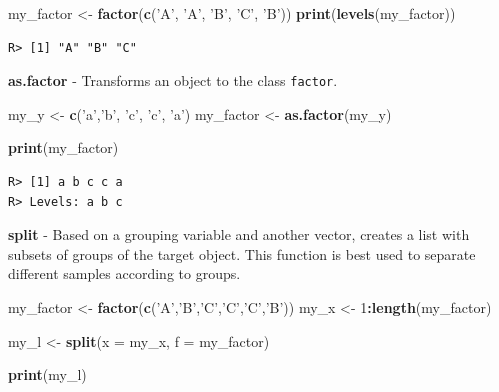 \documentclass[
  12pt,
]{book}
\newenvironment{Shaded}{\begin{snugshade}}{\end{snugshade}}
\newcommand{\DataTypeTok}[1]{\textcolor[rgb]{0.27,0.27,0.27}{#1}}
\newcommand{\DecValTok}[1]{\textcolor[rgb]{0.06,0.06,0.06}{#1}}
\newcommand{\KeywordTok}[1]{\textcolor[rgb]{0.27,0.27,0.27}{\textbf{#1}}}
\newcommand{\NormalTok}[1]{#1}
\newcommand{\OperatorTok}[1]{\textcolor[rgb]{0.43,0.43,0.43}{\textbf{#1}}}
\newcommand{\StringTok}[1]{\textcolor[rgb]{0.5,0.5,0.5}{#1}}
\begin{document}
\begin{Shaded}
\begin{Highlighting}[]
\NormalTok{my_factor <-}\StringTok{ }\KeywordTok{factor}\NormalTok{(}\KeywordTok{c}\NormalTok{(}\StringTok{'A'}\NormalTok{, }\StringTok{'A'}\NormalTok{, }\StringTok{'B'}\NormalTok{, }\StringTok{'C'}\NormalTok{, }\StringTok{'B'}\NormalTok{))}
\KeywordTok{print}\NormalTok{(}\KeywordTok{levels}\NormalTok{(my_factor))}
\end{Highlighting}
\end{Shaded}

\begin{verbatim}
R> [1] "A" "B" "C"
\end{verbatim}

\textbf{as.factor} - Transforms an object to the class \texttt{factor}. 

\begin{Shaded}
\begin{Highlighting}[]
\NormalTok{my_y <-}\StringTok{ }\KeywordTok{c}\NormalTok{(}\StringTok{'a'}\NormalTok{,}\StringTok{'b'}\NormalTok{, }\StringTok{'c'}\NormalTok{, }\StringTok{'c'}\NormalTok{, }\StringTok{'a'}\NormalTok{)}
\NormalTok{my_factor <-}\StringTok{ }\KeywordTok{as.factor}\NormalTok{(my_y)}

\KeywordTok{print}\NormalTok{(my_factor)}
\end{Highlighting}
\end{Shaded}

\begin{verbatim}
R> [1] a b c c a
R> Levels: a b c
\end{verbatim}

\textbf{split} - Based on a grouping variable and another vector, creates a list with subsets of groups of the target object. This function is best used to separate different samples according to groups. 

\begin{Shaded}
\begin{Highlighting}[]
\NormalTok{my_factor <-}\StringTok{ }\KeywordTok{factor}\NormalTok{(}\KeywordTok{c}\NormalTok{(}\StringTok{'A'}\NormalTok{,}\StringTok{'B'}\NormalTok{,}\StringTok{'C'}\NormalTok{,}\StringTok{'C'}\NormalTok{,}\StringTok{'C'}\NormalTok{,}\StringTok{'B'}\NormalTok{))}
\NormalTok{my_x <-}\StringTok{ }\DecValTok{1}\OperatorTok{:}\KeywordTok{length}\NormalTok{(my_factor)}

\NormalTok{my_l <-}\StringTok{ }\KeywordTok{split}\NormalTok{(}\DataTypeTok{x =}\NormalTok{ my_x, }\DataTypeTok{f =}\NormalTok{ my_factor)}

\KeywordTok{print}\NormalTok{(my_l)}
\end{Highlighting}
\end{Shaded}
\end{document}
